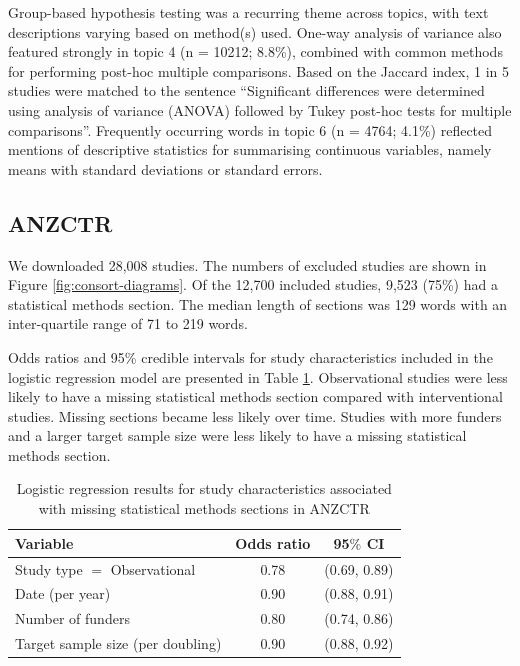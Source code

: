 \documentclass[12pt]{article}
\begin{document}
Group-based hypothesis testing was a recurring theme across topics, with
text descriptions varying based on method(s) used. One-way analysis of
variance also featured strongly in topic 4 (n = 10212; 8.8\%), combined
with common methods for performing post-hoc multiple comparisons. Based
on the Jaccard index, 1 in 5 studies were matched to the sentence
``Significant differences were determined using analysis of variance
(ANOVA) followed by Tukey post-hoc tests for multiple comparisons''.
Frequently occurring words in topic 6 (n = 4764; 4.1\%) reflected
mentions of descriptive statistics for summarising continuous variables,
namely means with standard deviations or standard errors.

\subsection{ANZCTR}

We downloaded 28,008 studies. The numbers of excluded studies are shown
in Figure \ref{fig:consort-diagrams}. Of the 12,700 included studies,
9,523 (75\%) had a statistical methods section. The median length of
sections was 129 words with an inter-quartile range of 71 to 219 words.

Odds ratios and 95\% credible intervals for study characteristics
included in the logistic regression model are presented in Table
\ref{tab:anzctr-missing-odds}. Observational studies were less likely to
have a missing statistical methods section compared with interventional
studies. Missing sections became less likely over time. Studies with
more funders and a larger target sample size were less likely to have a
missing statistical methods section.

\begin{table}[]
\centering
\caption{Logistic regression results for study characteristics associated with missing statistical methods sections in ANZCTR}
\label{tab:anzctr-missing-odds}
\begin{tabular}{lcc}
\hline
Variable & Odds ratio & 95$\%$ CI \\
\hline
Study type $=$ Observational & 0.78 & (0.69, 0.89) \\
Date (per year) & 0.90 & (0.88, 0.91) \\
Number of funders & 0.80 & (0.74, 0.86) \\
Target sample size (per doubling) & 0.90 & (0.88, 0.92)\\
\hline
\end{tabular}
\end{table}
\end{document}
